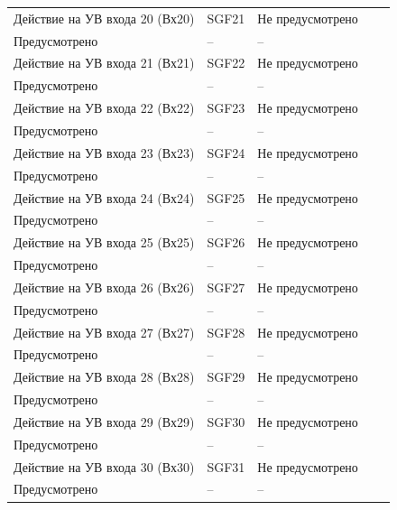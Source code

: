 \begin{longtable}{|>{\centering\arraybackslash}m{5.3cm}|>{\centering\arraybackslash}m{3.3cm}|>{\centering\arraybackslash}m{4.2cm}|>{\centering\arraybackslash}m{1.8cm}|>{\centering\arraybackslash}m{1cm}|}
\hline
\centering Действие на УВ входа 20 (Вх20)  & \centering SGF21 & \centering Не предусмотрено \\ Предусмотрено & \centering -- & \centering \arraybackslash -- \\
\hline
\centering Действие на УВ входа 21 (Вх21)  & \centering SGF22 & \centering Не предусмотрено \\ Предусмотрено & \centering -- & \centering \arraybackslash -- \\
\hline
\centering Действие на УВ входа 22 (Вх22)  & \centering SGF23 & \centering Не предусмотрено \\ Предусмотрено & \centering -- & \centering \arraybackslash -- \\
\hline
\centering Действие на УВ входа 23 (Вх23)  & \centering SGF24 & \centering Не предусмотрено \\ Предусмотрено & \centering -- & \centering \arraybackslash -- \\
\hline
\centering Действие на УВ входа 24 (Вх24)  & \centering SGF25 & \centering Не предусмотрено \\ Предусмотрено & \centering -- & \centering \arraybackslash -- \\
\hline
\centering Действие на УВ входа 25 (Вх25)  & \centering SGF26 & \centering Не предусмотрено \\ Предусмотрено & \centering -- & \centering \arraybackslash -- \\
\hline
\centering Действие на УВ входа 26 (Вх26)  & \centering SGF27 & \centering Не предусмотрено \\ Предусмотрено & \centering -- & \centering \arraybackslash -- \\
\hline
\centering Действие на УВ входа 27 (Вх27)  & \centering SGF28 & \centering Не предусмотрено \\ Предусмотрено & \centering -- & \centering \arraybackslash -- \\
\hline
\centering Действие на УВ входа 28 (Вх28)  & \centering SGF29 & \centering Не предусмотрено \\ Предусмотрено & \centering -- & \centering \arraybackslash -- \\
\hline
\centering Действие на УВ входа 29 (Вх29)  & \centering SGF30 & \centering Не предусмотрено \\ Предусмотрено & \centering -- & \centering \arraybackslash -- \\
\hline
\centering Действие на УВ входа 30 (Вх30)  & \centering SGF31 & \centering Не предусмотрено \\ Предусмотрено & \centering -- & \centering \arraybackslash -- \\

\end{longtable}
